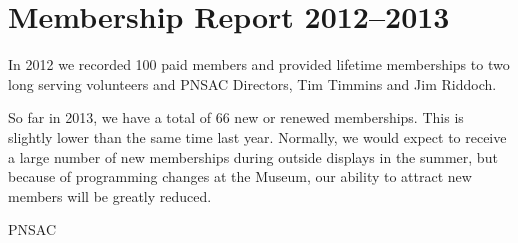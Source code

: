 \section{Membership Report 2012--2013}
\label{sec:membership}

In 2012 we recorded 100 paid members and provided lifetime memberships
to two long serving volunteers and PNSAC Directors, Tim Timmins and
Jim Riddoch.

So far in 2013, we have a total of 66 new or renewed memberships.
This is slightly lower than the same time last year.  Normally, we
would expect to receive a large number of new memberships during
outside displays in the summer, but because of programming changes at
the Museum, our ability to attract new members will be greatly
reduced.

\begin{footnotesize}
  \raggedleft PNSAC\\
\end{footnotesize}



